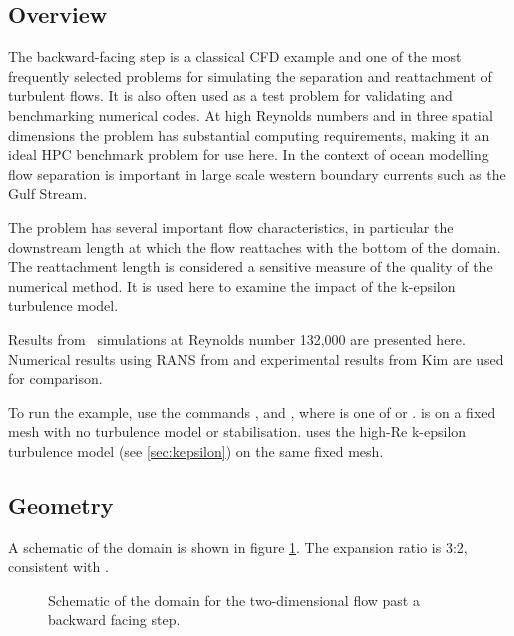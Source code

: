 \subsection{Overview}
The backward-facing step is a classical CFD example and one of the most frequently selected
problems for simulating the separation and reattachment of turbulent flows.
It is also often used as a test problem for validating and benchmarking numerical codes.
At high Reynolds numbers and in three spatial dimensions the problem has substantial
computing requirements, making it an ideal HPC benchmark problem for use here.
In the context of ocean modelling flow separation is important
in large scale western boundary currents such as the Gulf Stream.

The problem has several important flow characteristics,
in particular the downstream length at which the flow reattaches with the bottom of the domain.
The reattachment length is considered a sensitive measure of the quality of the numerical method.
It is used here to examine the impact of the k-epsilon turbulence model.

Results from \fluidity\ simulations at Reynolds number 132,000
are presented here. Numerical results using RANS from \cite{ilinca_97}
and experimental results from Kim \cite{ilinca_97} are used for comparison.

To run the example, use the commands , 
and , where  is one of  or
.  is on a fixed mesh with no turbulence model
or stabilisation.  uses the high-Re k-epsilon turbulence model (see \ref{sec:kepsilon})
on the same fixed mesh.

\subsection{Geometry}
A schematic of the domain is shown in figure \ref{Fig:Schematic2d}.
The expansion ratio is 3:2, consistent with \cite{ilinca_97}.

\begin{figure}
\centering
{}
\caption{Schematic of the domain for the two-dimensional flow past a backward facing step.}
\label{Fig:Schematic2d}
\end{figure}

